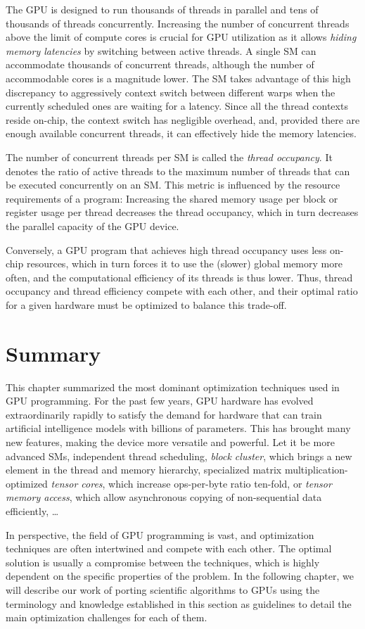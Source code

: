 The GPU is designed to run thousands of threads in parallel and tens of thousands of threads concurrently. Increasing the number of concurrent threads above the limit of compute cores is crucial for GPU utilization as it allows \emph{hiding memory latencies} by switching between active threads. A single SM can accommodate thousands of concurrent threads, although the number of accommodable cores is a magnitude lower. The SM takes advantage of this high discrepancy to aggressively context switch between different warps when the currently scheduled ones are waiting for a latency. Since all the thread contexts reside on-chip, the context switch has negligible overhead, and, provided there are enough available concurrent threads, it can effectively hide the memory latencies.

The number of concurrent threads per SM is called the \emph{thread occupancy}. It denotes the ratio of active threads to the maximum number of threads that can be executed concurrently on an SM. This metric is influenced by the resource requirements of a program: Increasing the shared memory usage per block or register usage per thread decreases the thread occupancy, which in turn decreases the parallel capacity of the GPU device.

Conversely, a GPU program that achieves high thread occupancy uses less on-chip resources, which in turn forces it to use the (slower) global memory more often, and the computational efficiency of its threads is thus lower. Thus, thread occupancy and thread efficiency compete with each other, and their optimal ratio for a given hardware must be optimized to balance this trade-off.

\section{Summary}

This chapter summarized the most dominant optimization techniques used in GPU programming. For the past few years, GPU hardware has evolved extraordinarily rapidly to satisfy the demand for hardware that can train artificial intelligence models with billions of parameters. This has brought many new features, making the device more versatile and powerful. Let it be more advanced SMs, independent thread scheduling, \emph{block cluster}, which brings a new element in the thread and memory hierarchy, specialized matrix multiplication-optimized \emph{tensor cores}, which increase ops-per-byte ratio ten-fold, or \emph{tensor memory access}, which allow asynchronous copying of non-sequential data efficiently, \dots

In perspective, the field of GPU programming is vast, and optimization techniques are often intertwined and compete with each other. The optimal solution is usually a compromise between the techniques, which is highly dependent on the specific properties of the problem. In the following chapter, we will describe our work of porting scientific algorithms to GPUs using the terminology and knowledge established in this section as guidelines to detail the main optimization challenges for each of them.